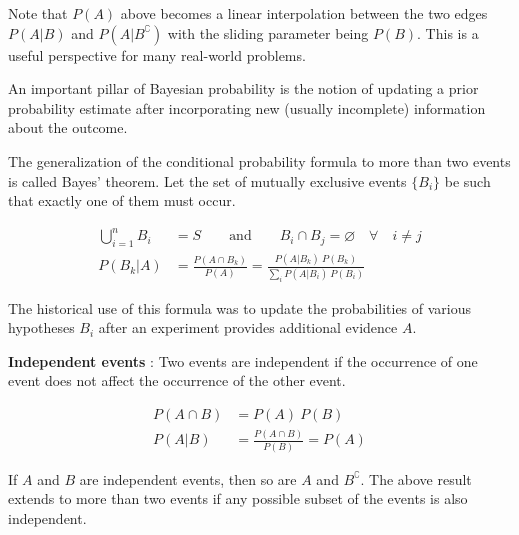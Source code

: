 Note that $ P(A) $ above becomes a linear interpolation between the two edges $ P(A|B) $ and $ P(A|B^\complement) $ with the sliding parameter being $ P(B) $. This is a useful perspective for many real-world problems.

An important pillar of Bayesian probability is the notion of updating a prior probability estimate after incorporating new (usually incomplete) information about the outcome.

The generalization of the conditional probability formula to more than two events is called Bayes' theorem. Let the set of mutually exclusive events $ \{ B_i \} $ be such that exactly one of them must occur.

\begin{align}
	\bigcup_{i = 1}^{n} B_i &= S \qquad \text{and} \qquad B_i \cap B_j = \varnothing \quad \forall \quad i \neq j \\
	P(B_k|A) &= \frac{P(A \cap B_k)}{P(A)} = \frac{P(A | B_k) \ P(B_k)}{\sum_{i}P(A | B_i) \ P(B_i)}
\end{align}

The historical use of this formula was to update the probabilities of various hypotheses $ {B_i} $ after an experiment provides additional evidence $ A $.

\textbf{Independent events} : Two events are independent if the occurrence of one event does not affect the occurrence of the other event. 

\begin{align}
	P(A \cap B) &= P(A) \ P(B) \\
	P(A|B) &= \frac{P(A \cap B)}{P(B)} = P(A)
\end{align}

If $ A $ and $ B $ are independent events, then so are $ A $ and $ B^\complement $. The above result extends to more than two events if any possible subset of the events is also independent. 

\newpage

